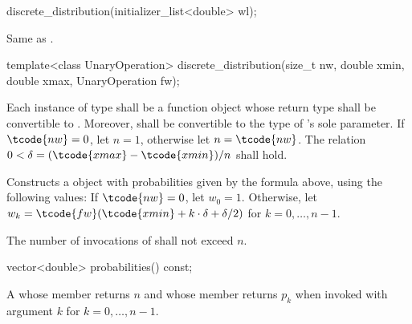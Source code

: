 %
\begin{itemdecl}
discrete_distribution(initializer_list<double> wl);
\end{itemdecl}

\begin{itemdescr}
\pnum\effects
 Same as .
\end{itemdescr}

\begin{itemdecl}
template<class UnaryOperation>
  discrete_distribution(size_t nw, double xmin, double xmax, UnaryOperation fw);
\end{itemdecl}

\begin{itemdescr}
\pnum\requires
 Each instance of type 
 shall be a function object
 whose return type shall be convertible to .
 Moreover,
  shall be convertible
 to the type of 's sole parameter.
 If $\tcode{nw} = 0$, let $n = 1$, otherwise let $n = \tcode{nw}$.
 The relation
   $0 < \delta = (\tcode{xmax} - \tcode{xmin}) / n$
 shall hold.

\pnum\effects Constructs a  object
 with probabilities given by the formula above,
 using the following values:
 If $\tcode{nw} = 0$,
 let $w_0 = 1$.
 Otherwise,
 let $w_k = \tcode{fw}(\tcode{xmin} + k \cdot \delta + \delta / 2)$
 for $k = 0, \dotsc, n - 1$.

\pnum\complexity
 The number of invocations of  shall not exceed $n$.
\end{itemdescr}

%
\begin{itemdecl}
vector<double> probabilities() const;
\end{itemdecl}

\begin{itemdescr}
\pnum\returns A 
 whose  member returns $n$
 and whose  member returns $p_k$
 when invoked with argument $k$ for $k = 0, \dotsc, n - 1$.
\end{itemdescr}



